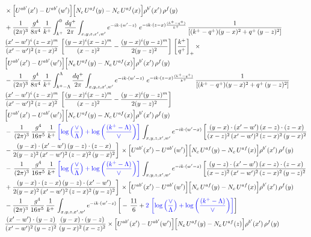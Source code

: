 \documentclass[9pt]{article}
\numberwithin{equation}{section}
\begin{document}
\begin{align}
&\times\Big[U^{ab'}(x')-U^{ab'}(w')\Big]\Big[N_{c}\,U^{af}(y)-N_{c}\,U^{af}(x)\Big]\rho^{b'}(x')\,\rho^{f}(y)\notag \\ & + \frac{1}{(2\pi)^{3}}\,\frac{g^{4}}{8\pi^{4}}\,\frac{1}{k^{+}}\int_{k^{+}}^{0}\frac{dq^{+}}{2\pi}\int_{x,y,z,x',w'}e^{-ik\cdot(w'-z)}\ e^{-ik\cdot(z-x)\frac{(k^{+}-q^{+})}{k^{+}}}\,\frac{1}{\left[(k^{+}-q^{+})(y-x)^{2}+q^{+}\,(y-z)^{2}\right]}\notag \\ & \frac{(x'-w')^{i}\,(z-x)^{m}}{(x'-w')^{2}\,(z-x)^{2}}\,\left[\frac{(y-x)^{i}(x-z)^{m}}{(x-z)^{2}}-\frac{(y-x)^{i}(y-z)^{m}}{2(y-z)^{2}}\right]\,\left[\frac{k^{+}}{q^{+}}\right]_{+}\times\notag \\ & \Big[U^{ab'}(x')-U^{ab'}(w')\Big]\Big[N_{c}\,U^{af}(y)-N_{c}\,U^{af}(x)\Big]\rho^{b'}(x')\,\rho^{f}(y)\notag \\ & - \frac{1}{(2\pi)^{3}}\,\frac{g^{4}}{8\pi^{4}}\,\frac{1}{k^{+}}\int_{k^{+}-\Lambda}^{\Lambda}\frac{dq^{+}}{2\pi}\int_{x,y,z,x',w'}e^{-ik\cdot(w'-z)}\ e^{-ik\cdot(z-x)\frac{(k^{+}-q^{+})}{k^{+}}}\,\frac{1}{\left[(k^{+}-q^{+})(y-x)^{2}+q^{+}\,(y-z)^{2}\right]}\notag \\ & \frac{(x'-w')^{i}\,(z-x)^{m}}{(x'-w')^{2}\,(z-x)^{2}}\,\left[\frac{(y-x)^{i}(x-z)^{m}}{(x-z)^{2}}-\frac{(y-x)^{i}(y-z)^{m}}{2(y-z)^{2}}\right]\notag \\ & \Big[U^{ab'}(x')-U^{ab'}(w')\Big]\Big[N_{c}\,U^{af}(y)-N_{c}\,U^{af}(x)\Big]\rho^{b'}(x')\,\rho^{f}(y)\notag \\ & -\, \frac{1}{(2\pi)^{3}}\,\frac{g^{4}}{16\pi^{5}}\,\frac{1}{k^{+}}\,{\color{blue}\left[\log{\left(\frac{\vee}{\Lambda}\right)} + \log{\left(\frac{(k^{+}-\Lambda)}{\vee}\right)}\right]}\,\int_{x,y,z,x',w'}e^{-ik\cdot(w'-x)}\, \bigg[\frac{(y-x)\cdot (x'-w')\,(x-z)\cdot (z-x)}{(x-z)^{2}\,(x'-w')^{2}\,(z-x)^{2}\,(y-x)^{2}}\notag \\ & -\frac{(y-x)\cdot (x'-w')\,(y-z)\cdot (z-x)}{2(y-z)^{2}\,(x'-w')^{2}\,(z-x)^{2}\,(y-x)^{2}}\bigg]\,\times \Big[U^{ab'}(x')-U^{ab'}(w')\Big]\Big[N_{c}\,U^{af}(y)-N_{c}\,U^{af}(x)\Big]\rho^{b'}(x')\,\rho^{f}(y)\notag \\ & -\, \frac{1}{(2\pi)^{3}}\,\frac{g^{4}}{16\pi^{5}}\,\frac{1}{k^{+}}\,{\color{blue}\left[\log{\left(\frac{\vee}{\Lambda}\right)} + \log{\left(\frac{(k^{+}-\Lambda)}{\vee}\right)}\right]}\,\int_{x,y,z,x',w'}e^{-ik\cdot(w'-z)}\,\bigg[\frac{(y-z)\cdot (x'-w')\,(x-z)\cdot (z-x)}{(x-z)^{2}\,(x'-w')^{2}\,(z-x)^{2}\,(y-z)^{2}}\notag \\ & +\frac{(y-x)\cdot (z-x)\,(y-z)\cdot (x'-w')}{2(y-x)^{2}\,(x'-w')^{2}\,(z-x)^{2}\,(y-z)^{2}}\bigg]\,\times \Big[U^{ab'}(x')-U^{ab'}(w')\Big]\Big[N_{c}\,U^{af}(y)-N_{c}\,U^{af}(x)\Big]\rho^{b'}(x')\,\rho^{f}(y)\notag \\ & - \frac{1}{(2\pi)^{3}}\,\frac{g^{4}}{16\pi^{5}}\,\frac{1}{k^{+}}\,\int_{x,y,z,x',w'}e^{-ik\cdot(w'-z)}\,\bigg[-\,\frac{11}{6}+{\color{blue}2\,\left[\log{\left(\frac{\vee}{\Lambda}\right)} + \log{\left(\frac{(k^{+}-\Lambda)}{\vee}\right)}\right]}\bigg]\notag \\ & \frac{(x'-w')\cdot(y-z)}{(x'-w')^{2}\,(y-z)^{2}}\,\frac{(y-x)\cdot(y-z)}{(y-x)^{2}\,(x-z)^{2}}\times\Big[U^{ab'}(x')-U^{ab'}(w')\Big]\Big[N_{c}\,U^{af}(y)-N_{c}\,U^{af}(z)\Big]\rho^{b'}(x')\,\rho^{f}(y)
\end{align}
\end{document}
